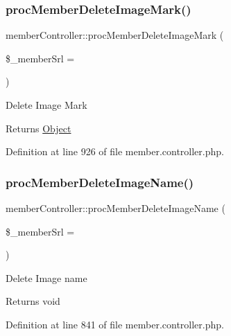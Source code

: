 \subsubsection{\texorpdfstring{proc\+Member\+Delete\+Image\+Mark()}{procMemberDeleteImageMark()}}
{\footnotesize\ttfamily member\+Controller\+::proc\+Member\+Delete\+Image\+Mark (\begin{DoxyParamCaption}\item[{}]{\$\+\_\+member\+Srl = {} }\end{DoxyParamCaption})}

Delete Image Mark

\begin{DoxyReturn}{Returns}
\hyperlink{classObject}{Object} 
\end{DoxyReturn}


Definition at line 926 of file member.\+controller.\+php.

\hypertarget{classmemberController_a5b2d6f21719829dcf1b422e9958bcf48}{}\label{classmemberController_a5b2d6f21719829dcf1b422e9958bcf48} 
\subsubsection{\texorpdfstring{proc\+Member\+Delete\+Image\+Name()}{procMemberDeleteImageName()}}
{\footnotesize\ttfamily member\+Controller\+::proc\+Member\+Delete\+Image\+Name (\begin{DoxyParamCaption}\item[{}]{\$\+\_\+member\+Srl = {} }\end{DoxyParamCaption})}

Delete Image name

\begin{DoxyReturn}{Returns}
void 
\end{DoxyReturn}


Definition at line 841 of file member.\+controller.\+php.

\hypertarget{classmemberController_a469c2f84ff27c0fb9fc9ae7f3b921548}{}\label{classmemberController_a469c2f84ff27c0fb9fc9ae7f3b921548} 
